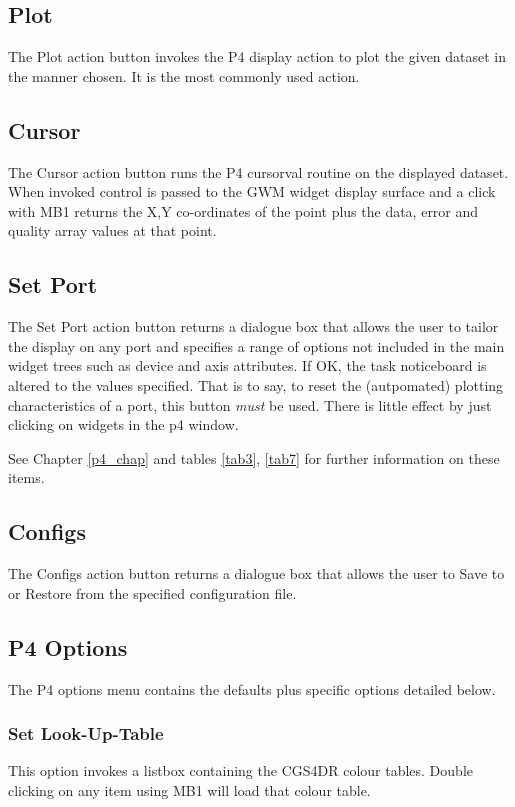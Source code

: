 \documentclass[a4paper]{book}
\renewcommand{\_}{{\tt\char'137}}
\begin{document}
\subsection{Plot}
The {\sf Plot} action button invokes the P4 display action to plot the given dataset
in the manner chosen. It is the most commonly used action.

\subsection{Cursor}
The {\sf Cursor} action button runs the P4 cursorval routine on the displayed dataset. 
When invoked control is passed to the GWM widget display surface and a click with
MB1 returns the X,Y co-ordinates of the point plus the data, error and quality array
values at that point.

\subsection{Set Port}
The {\sf Set Port} action button returns a dialogue box that
allows the user to tailor the display on any port and specifies a range of
options not included in the main widget trees such as device and axis attributes. If OK, the 
task noticeboard is altered to the values specified. That is to say, to reset the (autpomated)
plotting characteristics of a port, this button {\em must} be used. There is little effect
by just clicking on widgets in the p4 window.

See Chapter \ref{p4_chap} and tables
\ref{tab3}, \ref{tab7} for further information on these items.

\subsection{Configs}
The {\sf Configs} action button returns a dialogue box that
allows the user to {\sf Save} to or {\sf Restore} from the specified configuration
file. 

\subsection{P4 Options}
The P4 options menu contains the defaults plus specific options detailed below.

\subsubsection{Set Look-Up-Table}
This option invokes a listbox containing the CGS4DR colour tables. Double clicking
on any item using MB1 will load that colour table.
\end{document}
